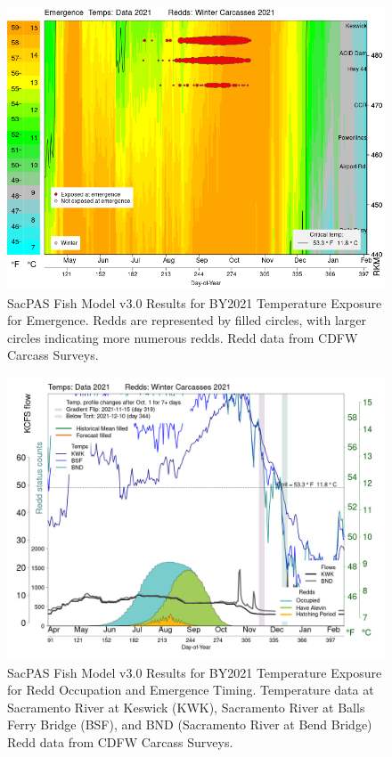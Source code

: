 \documentclass[
]{book}
\theoremstyle{definition}
\theoremstyle{definition}
\theoremstyle{definition}
\theoremstyle{definition}
\theoremstyle{remark}
\begin{document}
\begin{figure}

{\centering \includegraphics[width=1.5\linewidth]{figures/fishmodel_2021_emergenceplot} 

}

\caption{SacPAS Fish Model v3.0 Results for BY2021 Temperature Exposure for Emergence. Redds are represented by filled circles, with larger circles indicating more numerous redds. Redd data from CDFW Carcass Surveys.}\label{fig:fishmodel-emergence-fig}
\end{figure}

\begin{figure}

{\centering \includegraphics[width=22.22in]{figures/fishmodel_2021_reddstagesplot} 

}

\caption{SacPAS Fish Model v3.0 Results for BY2021 Temperature Exposure for Redd Occupation and Emergence Timing. Temperature data at Sacramento River at Keswick (KWK), Sacramento River at Balls Ferry Bridge (BSF), and BND (Sacramento River at Bend Bridge) Redd data from CDFW Carcass Surveys.}\label{fig:redd-occupation-emergence-timing-fig}
\end{figure}
\end{document}
